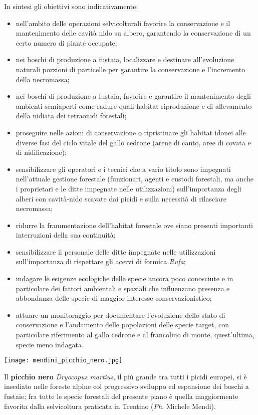 \documentclass[10pt,twoside,openany,x11names,svgnames,italian,a5paper,dvipsnames,table]{memoir}
\newcommand{\ph}{\emph{Ph}. }
\begin{document}
In sintesi gli obiettivi sono indicativamente:
\begin{itemize}\itemsep0pt
  \item nell’ambito delle operazioni selvicolturali favorire la conservazione e il mantenimento delle cavità nido su albero, garantendo la conservazione di un certo numero di piante occupate;
  \item nei boschi di produzione a fustaia, localizzare e destinare all’evoluzione naturali porzioni di particelle   per garantire la conservazione e l’incremento della  necromassa; 
  \item nei boschi di produzione a fustaia, favorire e garantire il mantenimento degli ambienti semiaperti come radure quali habitat riproduzione e di allevamento della nidiata dei tetraonidi forestali;
  \item proseguire nelle azioni di conservazione o ripristinare gli habitat idonei alle diverse fasi del ciclo vitale del gallo cedrone (arene di canto, aree di covata e di nidificazione);
  \item sensibilizzare gli operatori e i tecnici che a vario titolo sono impegnati nell’attuale gestione forestale (funzionari, agenti e custodi forestali, ma anche i proprietari e le ditte impegnate nelle utilizzazioni) sull’importanza degli alberi con cavità-nido scavate dai picidi e sulla necessità di rilasciare necromassa;
  \item ridurre la frammentazione dell’habitat forestale ove siano presenti importanti interruzioni della sua continuità;
  \item sensibilizzare il personale delle ditte impegnate nelle utilizzazioni sull’importanza di rispettare gli acervi di formica \emph{Rufa};
  \item indagare le esigenze ecologiche delle specie ancora poco conosciute e in particolare dei fattori ambientali e spaziali che influenzano presenza e abbondanza delle specie di maggior interesse conservazionistico;
  \item attuare un monitoraggio per documentare  l’evoluzione dello stato di conservazione e l’andamento delle popolazioni delle specie target, con particolare riferimento al gallo cedrone e al francolino di monte, quest’ultima, specie meno indagata.
\end{itemize}

\vspace*{\fill}
\begin{center}
  \texttt{[image: mendini\_picchio\_nero.jpg]}
  \captionsetup{width=.7\columnwidth}
  \caption*{Il \textbf{picchio nero} \emph{Dryocopus martius}, il più grande tra tutti i picidi europei, si è insediato nelle foreste alpine col progressivo sviluppo ed espansione dei boschi a fustaie; fra tutte le specie forestali del presente piano è quella maggiormente favorita dalla selvicoltura praticata in Trentino (\ph Michele Mendi).}
\end{center}
\vspace*{\fill}
\end{document}
